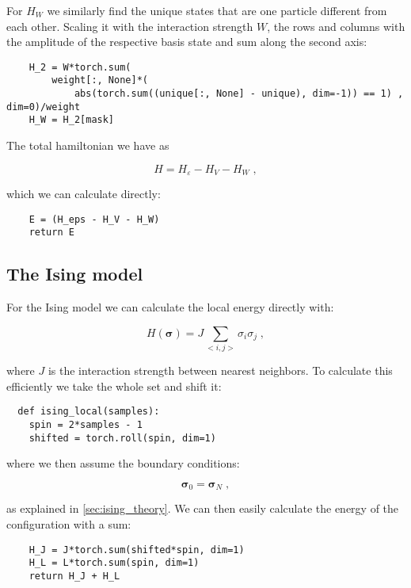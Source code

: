 For $H_W$ we similarly find the unique states that are one particle different from each other. Scaling it with the interaction strength $W$, the rows and columns with the amplitude of the respective basis state and sum along the second axis:

\begin{verbatim} 
    H_2 = W*torch.sum(
        weight[:, None]*(
            abs(torch.sum((unique[:, None] - unique), dim=-1)) == 1) , dim=0)/weight
    H_W = H_2[mask]
\end{verbatim}

The total hamiltonian we have as

\[
  H = H_{\varepsilon} - H_V - H_W \; ,
\]

which we can calculate directly:

\begin{verbatim} 
    E = (H_eps - H_V - H_W)
    return E
\end{verbatim}


\subsection{The Ising model}

For the Ising model we can calculate the local energy directly with:

\begin{equation}
  H(\mathbf{\sigma}) = J\sum_{<i,j>}\sigma_i\sigma_j \; ,
  \label{eq:imp_hamil_ising}
\end{equation}

where $J$ is the interaction strength between nearest neighbors. To calculate this efficiently we take the whole set and shift it:

\begin{verbatim}
  def ising_local(samples):
    spin = 2*samples - 1
    shifted = torch.roll(spin, dim=1)
\end{verbatim}

where we then assume the boundary conditions:

\begin{equation}
  \mathbf{\sigma}_0 = \mathbf{\sigma}_N \; ,
  \label{eq:ising_boundary_imp}
\end{equation}

as explained in \ref{sec:ising_theory}. We can then easily calculate the energy of the configuration with a sum:

\begin{verbatim}
    H_J = J*torch.sum(shifted*spin, dim=1)
    H_L = L*torch.sum(spin, dim=1)
    return H_J + H_L
\end{verbatim}

